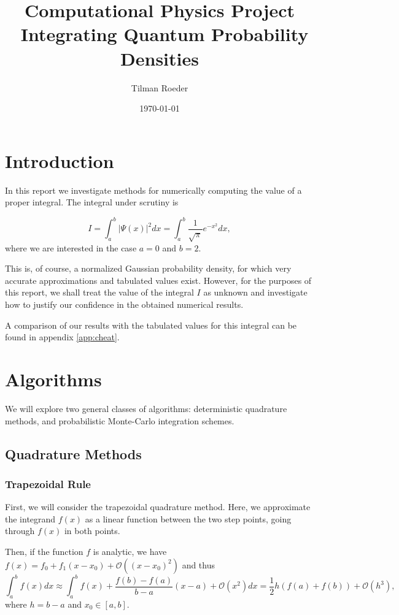 \documentclass[10pt, a4paper]{article}
\title{Computational Physics Project \\ Integrating Quantum Probability Densities}
\author{Tilman Roeder}
\date{\today}
\begin{document}
\maketitle

\section{Introduction}
In this report we investigate methods for numerically computing the value of a proper integral.
The integral under scrutiny is

\begin{equation}
\label{eq:target}
I = \int_a^b |\Psi(x)|^2 dx = \int_a^b \frac{1}{\sqrt{\pi}} e^{-x^2} dx,
\end{equation}
where we are interested in the case $a = 0$ and $b = 2$.

This is, of course, a normalized Gaussian probability density, for which
very accurate approximations and tabulated values exist. However, for the purposes of this report, we shall
treat the value of the integral $I$ as unknown and investigate how to justify our confidence in the
obtained numerical results.

A comparison of our results with the tabulated values for this integral can be found in appendix
\ref{app:cheat}.

\section{Algorithms}
We will explore two general classes of algorithms: deterministic quadrature methods, and probabilistic
Monte-Carlo integration schemes.

\subsection{Quadrature Methods}
  \subsubsection{Trapezoidal Rule}
  \label{sec:trap}
  First, we will consider the trapezoidal quadrature method. Here, we approximate the integrand $f(x)$
  as a linear function between the two step points, going through $f(x)$ in both points.

  Then, if the function $f$ is analytic, we have $f(x) = f_0 + f_1 (x-x_0) + \mathcal{O}((x-x_0)^2)$\footnotemark
  and thus
  \begin{equation}
  \int_a^b f(x) dx \approx
  \int_a^b f(x) + \frac{f(b) - f(a)}{b-a} (x-a) + \mathcal{O}(x^2) dx =
  \frac{1}{2} h (f(a) + f(b)) + \mathcal{O}(h^3),
  \end{equation}
  where $h = b-a$ and $x_0 \in [a,b]$.
\end{document}
